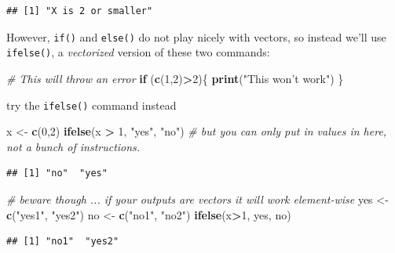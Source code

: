 \documentclass[]{article}
\newenvironment{Shaded}{\begin{snugshade}}{\end{snugshade}}
\newcommand{\KeywordTok}[1]{\textcolor[rgb]{0.13,0.29,0.53}{\textbf{#1}}}
\newcommand{\DecValTok}[1]{\textcolor[rgb]{0.00,0.00,0.81}{#1}}
\newcommand{\StringTok}[1]{\textcolor[rgb]{0.31,0.60,0.02}{#1}}
\newcommand{\CommentTok}[1]{\textcolor[rgb]{0.56,0.35,0.01}{\textit{#1}}}
\newcommand{\ControlFlowTok}[1]{\textcolor[rgb]{0.13,0.29,0.53}{\textbf{#1}}}
\newcommand{\OperatorTok}[1]{\textcolor[rgb]{0.81,0.36,0.00}{\textbf{#1}}}
\newcommand{\NormalTok}[1]{#1}
\begin{document}
\begin{verbatim}
## [1] "X is 2 or smaller"
\end{verbatim}

However, \texttt{if()} and \texttt{else()} do not play nicely with
vectors, so instead we'll use \texttt{ifelse()}, a \emph{vectorized}
version of these two commands:

\begin{Shaded}
\begin{Highlighting}[]
\CommentTok{# This will throw an error}
\ControlFlowTok{if}\NormalTok{ (}\KeywordTok{c}\NormalTok{(}\DecValTok{1}\NormalTok{,}\DecValTok{2}\NormalTok{)}\OperatorTok{>}\DecValTok{2}\NormalTok{)\{}
  \KeywordTok{print}\NormalTok{(}\StringTok{"This won't work"}\NormalTok{)}
\NormalTok{\}}
\end{Highlighting}
\end{Shaded}

try the \texttt{ifelse()} command instead

\begin{Shaded}
\begin{Highlighting}[]
\NormalTok{x <-}\StringTok{ }\KeywordTok{c}\NormalTok{(}\DecValTok{0}\NormalTok{,}\DecValTok{2}\NormalTok{)}
\KeywordTok{ifelse}\NormalTok{(x }\OperatorTok{>}\StringTok{ }\DecValTok{1}\NormalTok{, }\StringTok{"yes"}\NormalTok{, }\StringTok{"no"}\NormalTok{) }\CommentTok{# but you can only put in values in here, not a bunch of instructions.}
\end{Highlighting}
\end{Shaded}

\begin{verbatim}
## [1] "no"  "yes"
\end{verbatim}

\begin{Shaded}
\begin{Highlighting}[]
\CommentTok{# beware though ... if your outputs are vectors it will work element-wise}
\NormalTok{yes <-}\StringTok{ }\KeywordTok{c}\NormalTok{(}\StringTok{"yes1"}\NormalTok{, }\StringTok{"yes2"}\NormalTok{)}
\NormalTok{no <-}\StringTok{ }\KeywordTok{c}\NormalTok{(}\StringTok{"no1"}\NormalTok{, }\StringTok{"no2"}\NormalTok{)}
\KeywordTok{ifelse}\NormalTok{(x}\OperatorTok{>}\DecValTok{1}\NormalTok{, yes, no)}
\end{Highlighting}
\end{Shaded}

\begin{verbatim}
## [1] "no1"  "yes2"
\end{verbatim}
\end{document}
